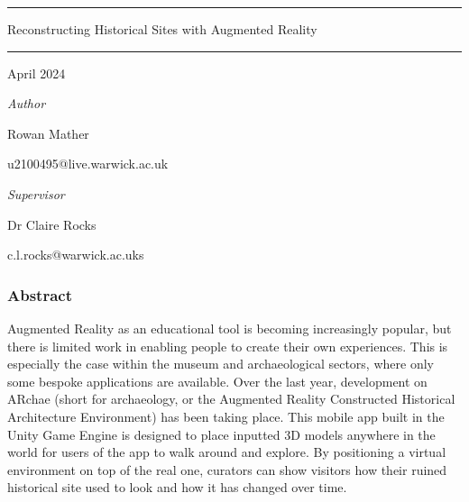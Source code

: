 \documentclass[12pt, a4paper]{article}
\begin{document}

\begin{titlepage}
\centering
    {\centering
    \vspace*{3cm}

    \hrule
    \vspace*{1cm}  
    {\huge Reconstructing Historical Sites with Augmented Reality}
    \vspace*{1 cm}  
    \hrule
    
    \vspace*{3cm}  
    
    {
    \Large
    April 2024
    }

    \vspace*{10cm} 
    }
    

    \begin{minipage}{.48\textwidth}
        \large
        \raggedright
        \textit{Author} \par 
        Rowan Mather \par u2100495@live.warwick.ac.uk
    \end{minipage}
    \begin{minipage}{.02\textwidth}
    \hspace{1pt}
    \end{minipage}
    \begin{minipage}{.48\textwidth}
        \raggedleft
        \large
        \textit{Supervisor} \par 
        Dr Claire Rocks \par c.l.rocks@warwick.ac.uks
    \end{minipage} 
            
\end{titlepage}

\newpage

\vspace*{1cm}

\begin{center}
\subsubsection*{Abstract}
\end{center}
Augmented Reality as an educational tool is becoming increasingly popular, but there is limited work in enabling people to create their own experiences. This is especially the case within the museum and archaeological sectors, where only some bespoke applications are available. Over the last year, development on ARchae (short for archaeology, or the Augmented Reality Constructed Historical Architecture Environment) has been taking place. This mobile app built in the Unity Game Engine is designed to place inputted 3D models anywhere in the world for users of the app to walk around and explore. By positioning a virtual environment on top of the real one, curators can show visitors how their ruined historical site used to look and how it has changed over time.
\end{document}
